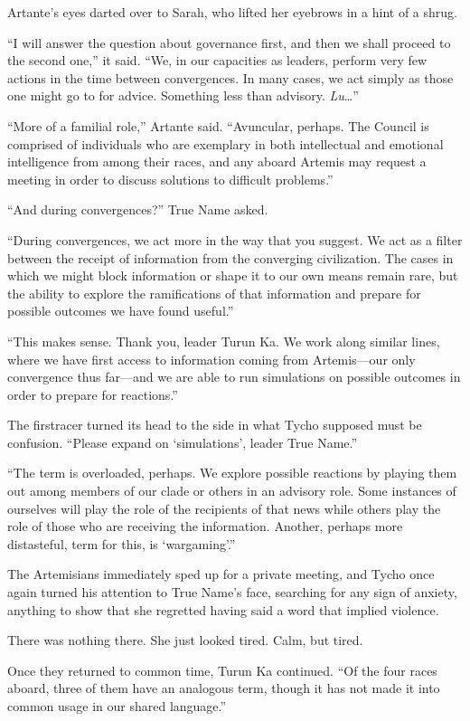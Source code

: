 Artante's eyes darted over to Sarah, who lifted her eyebrows in a hint of a shrug.

``I will answer the question about governance first, and then we shall proceed to the second one,'' it said. ``We, in our capacities as leaders, perform very few actions in the time between convergences. In many cases, we act simply as those one might go to for advice. Something less than advisory. \emph{Lu}\ldots{}''

``More of a familial role,'' Artante said. ``Avuncular, perhaps. The Council is comprised of individuals who are exemplary in both intellectual and emotional intelligence from among their races, and any aboard Artemis may request a meeting in order to discuss solutions to difficult problems.''

``And during convergences?'' True Name asked.

``During convergences, we act more in the way that you suggest. We act as a filter between the receipt of information from the converging civilization. The cases in which we might block information or shape it to our own means remain rare, but the ability to explore the ramifications of that information and prepare for possible outcomes we have found useful.''

``This makes sense. Thank you, leader Turun Ka. We work along similar lines, where we have first access to information coming from Artemis—our only convergence thus far—and we are able to run simulations on possible outcomes in order to prepare for reactions.''

The firstracer turned its head to the side in what Tycho supposed must be confusion. ``Please expand on `simulations', leader True Name.''

``The term is overloaded, perhaps. We explore possible reactions by playing them out among members of our clade or others in an advisory role. Some instances of ourselves will play the role of the recipients of that news while others play the role of those who are receiving the information. Another, perhaps more distasteful, term for this, is `wargaming'.''

The Artemisians immediately sped up for a private meeting, and Tycho once again turned his attention to True Name's face, searching for any sign of anxiety, anything to show that she regretted having said a word that implied violence.

There was nothing there. She just looked tired. Calm, but tired.

Once they returned to common time, Turun Ka continued. ``Of the four races aboard, three of them have an analogous term, though it has not made it into common usage in our shared language.''

